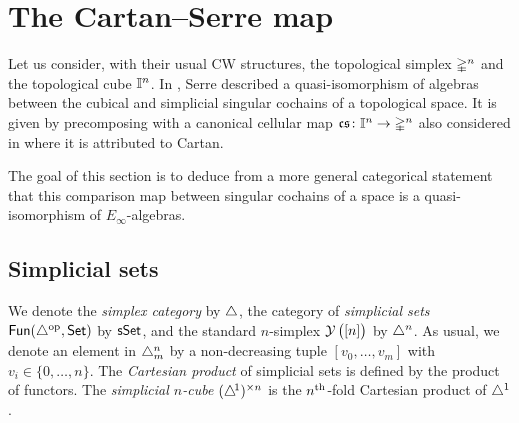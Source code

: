 
\section{The Cartan--Serre map} \label{s:comparison}

Let us consider, with their usual CW structures, the topological simplex $\mathbb{\Delta}^n$ and the topological cube $\mathbb{I}^n$.
In \cite[p. 442]{serre1951homologie}, Serre described a quasi-isomorphism of algebras between the cubical and simplicial singular cochains of a topological space.
It is given by precomposing with a canonical cellular map $\operatorname{\mathfrak{cs}} \colon \mathbb{I}^n \to \mathbb{\Delta}^n$ also considered in \cite[p.199]{eilenberg1953acyclic} where it is attributed to Cartan.

The goal of this section is to deduce from a more general categorical statement that this comparison map between singular cochains of a space is a quasi-isomorphism of $E_\infty$-algebras.

\subsection{Simplicial sets} \label{ss:simplicial sets}


We denote the \textit{simplex category} by $\triangle$, the category of \textit{simplicial sets} $\mathsf{Fun}(\triangle^{\mathrm{op}}, \mathsf{Set})$ by $\mathsf{sSet}$, and the standard $n$-simplex $\operatorname{\mathcal{Y}} \big( [n] \big)$ by $\triangle^n$.
As usual, we denote an element in $\triangle^n_m$ by a non-decreasing tuple $[v_0, \dots, v_m]$ with $v_i \in \{0, \dots, n\}$.
The \textit{Cartesian product} of simplicial sets is defined by the product of functors.
The \textit{simplicial $n$-cube} $(\triangle^{\!1})^{\times n}$ is the $n^{\mathrm{th}}$-fold Cartesian product of $\triangle^1$.



